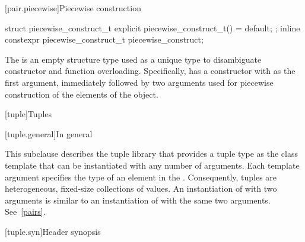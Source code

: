 [pair.piecewise]{Piecewise construction}

%
%
\begin{itemdecl}
struct piecewise_construct_t {
  explicit piecewise_construct_t() = default;
};
inline constexpr piecewise_construct_t piecewise_construct{};
\end{itemdecl}

\pnum
The   is an empty structure type
used as a unique type to disambiguate constructor and function overloading. Specifically,
 has a constructor with  as the
first argument, immediately followed by two  arguments used
for piecewise construction of the elements of the  object.

[tuple]{Tuples}

[tuple.general]{In general}

\pnum
{}%
This subclause describes the tuple library that provides a tuple type as
the class template  that can be instantiated with any number
of arguments. Each template argument specifies
the type of an element in the .  Consequently, tuples are
heterogeneous, fixed-size collections of values. An instantiation of  with
two arguments is similar to an instantiation of  with the same two arguments.
See~\ref{pairs}.

[tuple.syn]{Header  synopsis}

